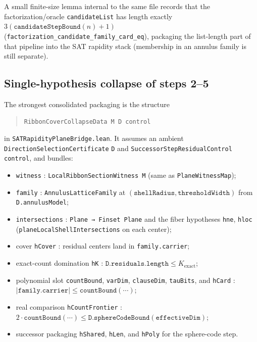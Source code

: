 \documentclass[11pt]{article}
\begin{document}
A small finite-size lemma internal to the same file records that the factorization/oracle
\texttt{candidateList} has length exactly \(3(\texttt{candidateStepBound}(n)+1)\)
(\texttt{factorization\_candidate\_family\_card\_eq}), packaging the list-length part of that
pipeline into the SAT rapidity stack (membership in an annulus family is still separate).

\subsection{Single-hypothesis collapse of steps 2--5}

The strongest consolidated packaging is the structure

\begin{quote}
\texttt{RibbonCoverCollapseData M D control}
\end{quote}

in \texttt{SATRapidityPlaneBridge.lean}.  It assumes an ambient
\texttt{DirectionSelectionCertificate} \texttt{D} and \texttt{SuccessorStepResidualControl}
\texttt{control}, and bundles:

\begin{itemize}[leftmargin=2em]
  \item \texttt{witness} : \texttt{LocalRibbonSectionWitness M} (same as \texttt{PlaneWitnessMap});
  \item \texttt{family} : \texttt{AnnulusLatticeFamily} at \((\texttt{shellRadius},\texttt{thresholdWidth})\) from \texttt{D.annulusModel};
  \item \texttt{intersections} : \texttt{Plane → Finset Plane} and the fiber hypotheses
  \texttt{hne}, \texttt{hloc} (\texttt{planeLocalShellIntersections} on each center);
  \item cover \texttt{hCover} : residual centers land in \texttt{family.carrier};
  \item exact-count domination \texttt{hK} : \(\texttt{D.residuals.length} \le K_{\mathrm{exact}}\);
  \item polynomial slot \texttt{countBound}, \texttt{varDim}, \texttt{clauseDim}, \texttt{tauBits}, and
  \texttt{hCard} : \(|\texttt{family.carrier}| \le \texttt{countBound}(\cdots)\);
  \item real comparison \texttt{hCountFrontier} :
  \(2\cdot\texttt{countBound}(\cdots) \le \texttt{D.sphereCodeBound}(\texttt{effectiveDim})\);
  \item successor packaging \texttt{hShared}, \texttt{hLen}, and \texttt{hPoly} for the sphere-code step.
\end{itemize}
\end{document}
